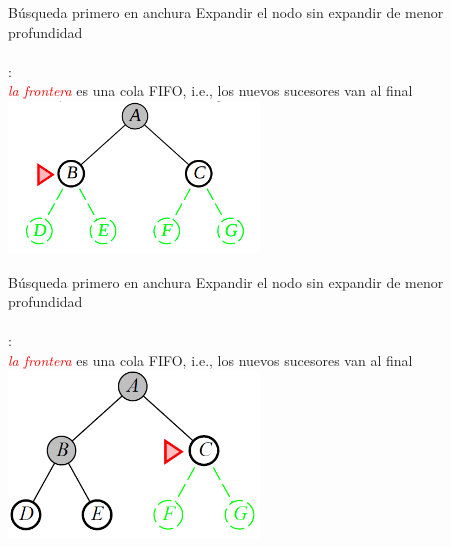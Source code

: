 \documentclass{beamer}
\theoremstyle{definition}
\theoremstyle{theorem}
\theoremstyle{remark}
\begin{document}
\begin{frame}{B\'usqueda primero en anchura}
    Expandir el nodo sin expandir de menor profundidad\\~\\
    :\\
    \quad\textcolor{red}{\textit{la frontera}} es una cola FIFO, i.e., los nuevos sucesores van al final
    \centering
    \includegraphics[width=0.5\textwidth]{34_image_bfs2.PNG}

\end{frame}


\begin{frame}{B\'usqueda primero en anchura}
    Expandir el nodo sin expandir de menor profundidad\\~\\
    :\\
    \quad\textcolor{red}{\textit{la frontera}} es una cola FIFO, i.e., los nuevos sucesores van al final
    \centering
    \includegraphics[width=0.5\textwidth]{35_image_bfs2.PNG}

\end{frame}
\end{document}
